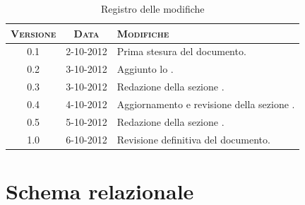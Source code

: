 \documentclass[10pt,a4paper,headinclude,footinclude,hidelinks]{scrreprt} %
\begin{document}
    \title{\rmfamily\normalfont{}}
    \author{}
    \date{\today}
    
    \maketitle
    
    \begin{abstract}
        \noindent Il documento presenta il modello relazionale per l'integrazione dei nuovi criteri di classificazione nella piattaforma.
    \end{abstract}
    
	\begin{table}[ht]
	\centering
	\begin{tabular}{|c|c|l|}
	\hline
	\textsc{Versione} & \textsc{Data} & \textsc{Modifiche} \\ \hline
	0.1 & 2-10-2012 & Prima stesura del documento. \\ \hline
	0.2 & 3-10-2012 & Aggiunto lo \nameref{gfx:schema-relazionale}. \\ \hline
	0.3 & 3-10-2012 & Redazione della sezione \nameref{ch:stage:er:operazioni}. \\ \hline
	0.4 & 4-10-2012 & Aggiornamento e revisione della sezione \nameref{ch:stage:er:operazioni}. \\ \hline
	0.5 & 5-10-2012 & Redazione della sezione \nameref{ch:stage:er:schema}. \\ \hline
	1.0 & 6-10-2012 & Revisione definitiva del documento. \\ \hline
	\end{tabular}
	\caption{Registro delle modifiche}
	\label{tab:stage:wp:workload}
	\end{table}

	\tableofcontents

	\chapter{Schema relazionale}
	\label{ch:stage:er:schema}
\end{document}
